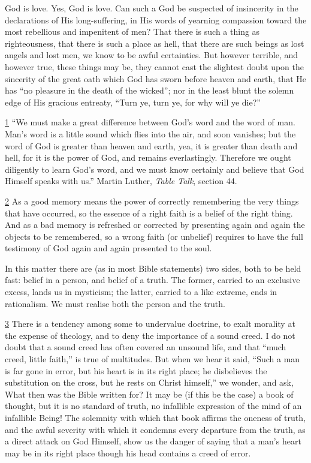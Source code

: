 \documentclass[
]{book}
\begin{document}
God is love. Yes, God is love. Can such a God be suspected of insincerity in the declarations of His long-suffering, in His words of yearning compassion toward the most rebellious and impenitent of men? That there is such a thing as righteousness, that there is such a place as hell, that there are such beings as lost angels and lost men, we know to be awful certainties. But however terrible, and however true, these things may be, they cannot cast the slightest doubt upon the sincerity of the great oath which God has sworn before heaven and earth, that He has ``no pleasure in the death of the wicked''; nor in the least blunt the solemn edge of His gracious entreaty, ``Turn ye, turn ye, for why will ye die?''

\protect\hyperlink{sdfootnote1anc}{1} ``We must make a great difference between God's word and the word of man. Man's word is a little sound which flies into the air, and soon vanishes; but the word of God is greater than heaven and earth, yea, it is greater than death and hell, for it is the power of God, and remains everlastingly. Therefore we ought diligently to learn God's word, and we must know certainly and believe that God Himself speaks with us.'' Martin Luther, \emph{Table Talk}, section 44.

\protect\hyperlink{sdfootnote2anc}{2} As a good memory means the power of correctly remembering the very things that have occurred, so the essence of a right faith is a belief of the right thing. And as a bad memory is refreshed or corrected by presenting again and again the objects to be remembered, so a wrong faith (or unbelief) requires to have the full testimony of God again and again presented to the soul.

In this matter there are (as in most Bible statements) two sides, both to be held fast: belief in a person, and belief of a truth. The former, carried to an exclusive excess, lands us in mysticism; the latter, carried to a like extreme, ends in rationalism. We must realise both the person and the truth.

\protect\hyperlink{sdfootnote3anc}{3} There is a tendency among some to undervalue doctrine, to exalt morality at the expense of theology, and to deny the importance of a sound creed. I do not doubt that a sound creed has often covered an unsound life, and that ``much creed, little faith,'' is true of multitudes. But when we hear it said, ``Such a man is far gone in error, but his heart is in its right place; he disbelieves the substitution on the cross, but he rests on Christ himself,'' we wonder, and ask, What then was the Bible written for? It may be (if this be the case) a book of thought, but it is no standard of truth, no infallible expression of the mind of an infallible Being! The solemnity with which that book affirms the oneness of truth, and the awful severity with which it condemns every departure from the truth, as a direct attack on God Himself, show us the danger of saying that a man's heart may be in its right place though his head contains a creed of error.
\end{document}
